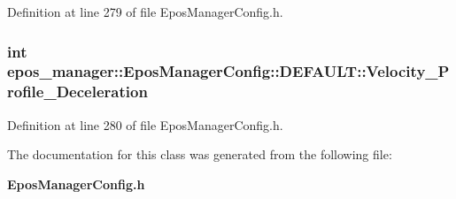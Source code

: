 \-Definition at line 279 of file \-Epos\-Manager\-Config.\-h.

\subsubsection[{\-Velocity\-\_\-\-Profile\-\_\-\-Deceleration}]{\setlength{\rightskip}{0pt plus 5cm}int {\bf epos\-\_\-manager\-::\-Epos\-Manager\-Config\-::\-D\-E\-F\-A\-U\-L\-T\-::\-Velocity\-\_\-\-Profile\-\_\-\-Deceleration}}\label{classepos__manager_1_1EposManagerConfig_1_1DEFAULT_a2449424f81564f2f3e4023ec51012414}


\-Definition at line 280 of file \-Epos\-Manager\-Config.\-h.



\-The documentation for this class was generated from the following file\-:\begin{DoxyCompactItemize}
\item 
{\bf \-Epos\-Manager\-Config.\-h}\end{DoxyCompactItemize}
